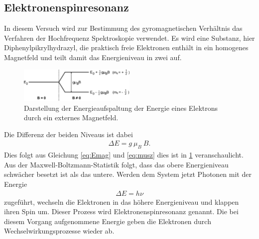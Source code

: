 \subsection{Elektronenspinresonanz}

In diesem Versuch wird zur Bestimmung des gyromagnetischen Verhältnis das Verfahren der Hochfrequenz Spektroskopie verwendet.
Es wird eine Substanz, hier Diphenylpikrylhydrazyl, die praktisch freie Elektronen enthält in ein homogenes Magnetfeld und teilt damit das Energieniveau in zwei auf.
\newpage
\begin{figure}
	\centering
	\includegraphics[width=0.5\textwidth]{../Grafiken/EnergieAufspaltung.pdf}
	\caption{Darstellung der Energieaufspaltung der Energie eines Elektrons durch ein externes Magnetfeld.\cite{V28}}\label{fig:Aufspaltung}
\end{figure}
Die Differenz der beiden Niveaus ist dabei 
\begin{align}
	\Delta E = g\ \mu_B \ B.
\end{align}
Dies folgt aus Gleichung \eqref{eq:Emag} und \eqref{eq:musz} dies ist in \cref{fig:Aufspaltung} veranschaulicht.
Aus der Maxwell-Boltzmann-Statistik folgt, dass das obere Energieniveau schwächer besetzt ist als das untere.
Werden dem System jetzt Photonen mit der Energie
\begin{align}
	\Delta E = h\nu
	\label{eq:energie}
\end{align}
zugeführt, wechseln die Elektronen in das höhere Energieniveau und klappen ihren Spin um.
Dieser Prozess wird Elektronenspinresonanz genannt.
Die bei diesem Vorgang aufgenommene Energie geben die Elektronen durch Wechselwirkungsprozesse wieder ab. 

{ %

}



